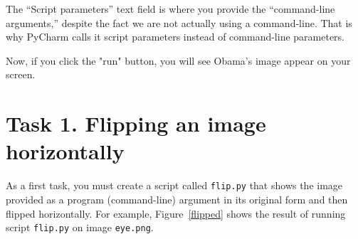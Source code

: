 \documentclass[titlepage]{tufte-book}
\newcommand{\figref}[1]{Figure~\ref{#1}}
\begin{document}

The ``Script parameters'' text field is where you provide the ``command-line arguments,'' despite the fact we are not actually using a command-line. That is why PyCharm calls it script parameters instead of command-line parameters.

Now, if you click the "run" button, you will see Obama's image appear on your screen.

\pagebreak

\section{Task 1. Flipping an image horizontally}

As a first task, you must create a script called {\tt flip.py} that shows the image provided as a program (command-line) argument in its original form and then flipped horizontally.  For example, \figref{flipped} shows the result of running script {\tt flip.py} on image {\tt eye.png}.
\end{document}
